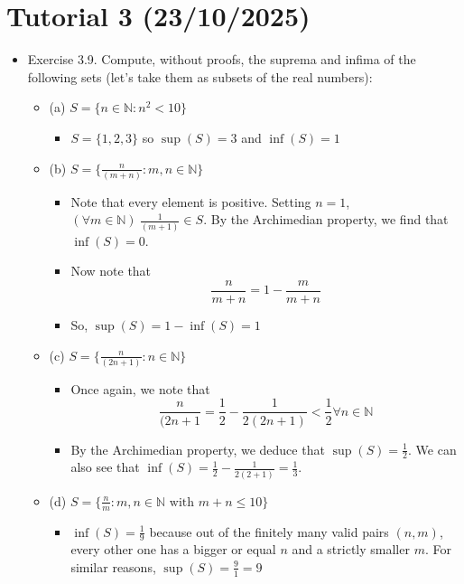 \documentclass{article}
\begin{document}
\section{Tutorial 3 (23/10/2025)}
\begin{itemize}
    \item Exercise 3.9. Compute, without proofs, the suprema and infima of the following sets (let's take them as subsets of the real numbers):
    \begin{itemize}
        \item (a) $S = \{ n \in \mathbb{N} : n^2 < 10 \}$
        \begin{itemize}
            \item $S = \{1,2,3\}$ so $\sup(S)=3$ and $\inf(S)=1$
        \end{itemize}
        \item (b) $S = \{ \frac{n}{(m+n)} : m,n \in \mathbb{N} \}$
        \begin{itemize}
            \item Note that every element is positive. Setting $n=1$, $(\forall m \in \mathbb{N}) \ \frac{1}{(m+1)} \in S$. By the Archimedian property, we find that $\inf(S) = 0$.
            \item Now note that
            \[
            \frac{n}{m+n} = 1 - \frac{m}{m+n}
            \]
            \item So, $\sup(S) = 1 - \inf(S) = 1$
        \end{itemize}
        \item (c) $S = \{ \frac{n}{(2n+1)} : n \in \mathbb{N} \}$
        \begin{itemize}
            \item Once again, we note that
            \[
            \frac{n}{(2n+1} = \frac{1}{2} - \frac{1}{2(2n+1)} < \frac{1}{2} \forall n \in \mathbb{N}
            \]
            \item By the Archimedian property, we deduce that $\sup(S) = \frac{1}{2}$. We can also see that $\inf(S) = \frac{1}{2} - \frac{1}{2(2+1)} = \frac{1}{3}$.
        \end{itemize}
        \item (d) $S = \{ \frac{n}{m} : m,n \in \mathbb{N} \text{ with } m+n \le 10 \}$
        \begin{itemize}
            \item $\inf(S) = \frac{1}{9}$ because out of the finitely many valid pairs $(n,m)$, every other one has a bigger or equal $n$ and a strictly smaller $m$. For similar reasons, $\sup(S) = \frac{9}{1} = 9$

\end{itemize}
\end{itemize}
\end{itemize}
\end{document}
